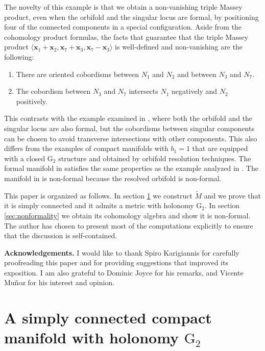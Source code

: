 \documentclass[10pt]{article}
\newcommand{\Gtwo}{\mathrm{G}_2}
\newcommand{\la}{\langle}
\newcommand{\ra}{\rangle}
\theoremstyle{plain}
\theoremstyle{definition}
\theoremstyle{remark}
\begin{document}
The novelty of this example is that we obtain a non-vanishing triple Massey product, even when the orbifold and the singular locus are formal, by positioning four of the connected components in a special configuration. Aside from the cohomology product formulas, the facts that guarantee that the triple Massey product
$
\la \mathbf{x}_1 + \mathbf{x}_2, \mathbf{x}_7 + \mathbf{x}_3, \mathbf{x}_7 - \mathbf{x}_3\ra
$
 is well-defined and non-vanishing are the following:
\begin{enumerate}
\item There are oriented cobordisms between $N_1$ and $N_2$ and between $N_3$ and $N_7$.
\item The cobordism between $N_3$ and $N_7$ intersects $N_1$ negatively and $N_2$ positively.
\end{enumerate}


This contrasts with the example examined in \cite{AT}, where both the orbifold and the singular locus are also formal, but the cobordisms between singular components can be chosen to avoid transverse intersections with other components. This also differs from the examples of compact manifolds with $b_1=1$ that are equipped with a closed $\Gtwo$ structure and obtained by orbifold resolution techniques. The formal manifold in \cite{FFKM} satisfies the same properties as the example analyzed in \cite{AT}. The manifold in \cite{LMM} is non-formal because the resolved orbifold is non-formal. 

This paper is organized as follows. In section \ref{sec:manifold} we construct $\widetilde{M}$ and we prove that it is simply connected and it admits a metric with holonomy $\Gtwo$. In section \ref{sec:nonformality} we obtain its cohomology algebra and show it is non-formal. The author has chosen to present most of the computations explicitly to ensure that the discussion is self-contained. 

 


\textbf{Acknowledgements.} I would like to thank Spiro Karigiannis for carefully proofreading this paper and for providing suggestions that improved its exposition. I am also grateful to Dominic Joyce for his remarks, and Vicente Muñoz for his interest and opinion.


 \newpage

\section{A simply connected compact manifold with holonomy $\Gtwo$} \label{sec:manifold} 
\end{document}
